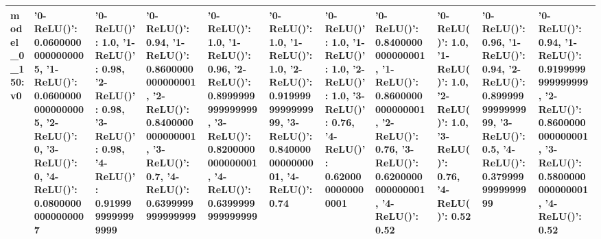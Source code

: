 \begin{tabular}{lllllllllll}
model_0_150:v0 & {'0-ReLU()': 0.06000000000000005, '1-ReLU()': 0.06000000000000005, '2-ReLU()': 0, '3-ReLU()': 0, '4-ReLU()': 0.08000000000000007} & {'0-ReLU()': 1.0, '1-ReLU()': 0.98, '2-ReLU()': 0.98, '3-ReLU()': 0.98, '4-ReLU()': 0.9199999999999999} & {'0-ReLU()': 0.94, '1-ReLU()': 0.8600000000000001, '2-ReLU()': 0.8400000000000001, '3-ReLU()': 0.7, '4-ReLU()': 0.6399999999999999} & {'0-ReLU()': 1.0, '1-ReLU()': 0.96, '2-ReLU()': 0.8999999999999999, '3-ReLU()': 0.8200000000000001, '4-ReLU()': 0.6399999999999999} & {'0-ReLU()': 1.0, '1-ReLU()': 1.0, '2-ReLU()': 0.9199999999999999, '3-ReLU()': 0.8400000000000001, '4-ReLU()': 0.74} & {'0-ReLU()': 1.0, '1-ReLU()': 1.0, '2-ReLU()': 1.0, '3-ReLU()': 0.76, '4-ReLU()': 0.6200000000000001} & {'0-ReLU()': 0.8400000000000001, '1-ReLU()': 0.8600000000000001, '2-ReLU()': 0.76, '3-ReLU()': 0.6200000000000001, '4-ReLU()': 0.52} & {'0-ReLU()': 1.0, '1-ReLU()': 1.0, '2-ReLU()': 1.0, '3-ReLU()': 0.76, '4-ReLU()': 0.52} & {'0-ReLU()': 0.96, '1-ReLU()': 0.94, '2-ReLU()': 0.8999999999999999, '3-ReLU()': 0.5, '4-ReLU()': 0.3799999999999999} & {'0-ReLU()': 0.94, '1-ReLU()': 0.9199999999999999, '2-ReLU()': 0.8600000000000001, '3-ReLU()': 0.5800000000000001, '4-ReLU()': 0.52} \\
\bottomrule
\end{tabular}
